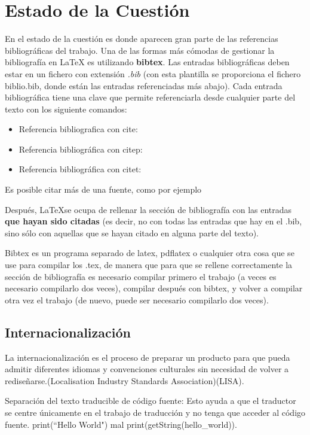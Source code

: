 \chapter{Estado de la Cuestión}
\label{cap:estadoDeLaCuestion}

En el estado de la cuestión es donde aparecen gran parte de las referencias bibliográficas del trabajo. Una de las formas más cómodas de gestionar la bibliografía en {\LaTeX} es utilizando \textbf{bibtex}. Las entradas bibliográficas deben estar en un fichero con extensión \textit{.bib} (con esta plantilla se proporciona el fichero biblio.bib, donde están las entradas referenciadas más abajo). Cada entrada bibliográfica tiene una clave que permite referenciarla desde cualquier parte del texto con los siguiente comandos:

\begin{itemize}
\item Referencia bibliografica con cite: \cite{ldesc2e}
\item Referencia bibliográfica con citep: \citep{notsoshort}
\item Referencia bibliográfica con citet: \citet{latexAPrimer}
\end{itemize}

Es posible citar más de una fuente, como por ejemplo \citep{latexCompanion,LaTeXLamport,texKnuth}

Después, \LaTeX se ocupa de rellenar la sección de bibliografía con las entradas \textbf{que hayan sido citadas} (es decir, no con todas las entradas que hay en el .bib, sino sólo con aquellas que se hayan citado en alguna parte del texto).

Bibtex es un programa separado de latex, pdflatex o cualquier otra cosa que se use para compilar los .tex, de manera que para que se rellene correctamente la sección de bibliografía es necesario compilar primero el trabajo (a veces es necesario compilarlo dos veces), compilar después con bibtex, y volver a compilar otra vez el trabajo (de nuevo, puede ser necesario compilarlo dos veces). 

\section{Internacionalización}
La internacionalización es el proceso de preparar un producto para que pueda admitir diferentes idiomas y convenciones culturales sin necesidad de volver a rediseñarse.(Localisation Industry Standards Association)(LISA).

Separación del texto traducible de código fuente: Esto ayuda a que el traductor se centre únicamente en el trabajo de traducción y no tenga que acceder al código fuente.
print(“Hello World") mal   print(getString(hello_world)).

